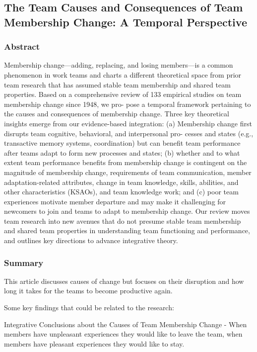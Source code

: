 \documentclass[12pt]{article}
\begin{document}
\subsection*{The Team Causes and Consequences of Team Membership Change: A Temporal Perspective\cite{team_causes}}

\subsubsection*{Abstract}

Membership change—adding, replacing, and losing members—is a common phenomenon in work teams and charts a different theoretical space from prior team research that has assumed stable team membership and shared team properties. Based on a comprehensive review of 133 empirical studies on team membership change since 1948, we pro- pose a temporal framework pertaining to the causes and consequences of membership change. Three key theoretical insights emerge from our evidence-based integration: (a) Membership change first disrupts team cognitive, behavioral, and interpersonal pro- cesses and states (e.g., transactive memory systems, coordination) but can benefit team performance after teams adapt to form new processes and states; (b) whether and to what extent team performance benefits from membership change is contingent on the magnitude of membership change, requirements of team communication, member adaptation-related attributes, change in team knowledge, skills, abilities, and other characteristics (KSAOs), and team knowledge work; and (c) poor team experiences motivate member departure and may make it challenging for newcomers to join and teams to adapt to membership change. Our review moves team research into new avenues that do not presume stable team membership and shared team properties in understanding team functioning and performance, and outlines key directions to advance integrative theory.


\subsubsection*{Summary}

This article discusses causes of change but focuses on their disruption and how long it takes for the teams to become productive again.

Some key findings that could be related to the research:

Integrative Conclusions about the Causes of Team Membership Change - When members have unpleasant experiences they would like to leave the team, when members have pleasant experiences they would like to stay.
\end{document}
